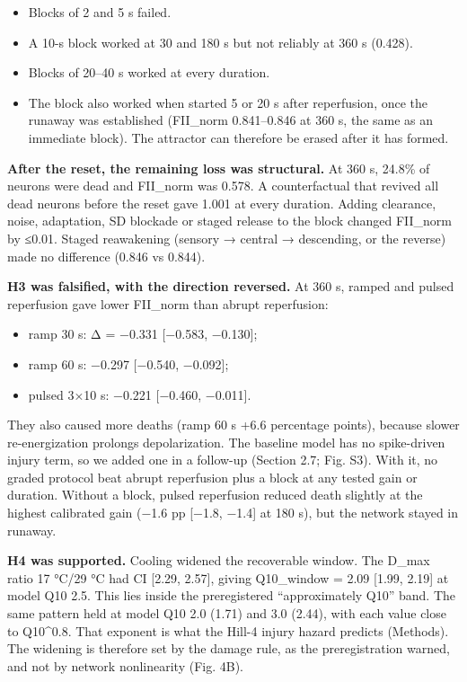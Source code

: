 \documentclass[11pt]{article}
\providecommand{\tightlist}{\setlength{\itemsep}{0pt}\setlength{\parskip}{0pt}}
\begin{document}
\begin{itemize}
\tightlist
\item
  Blocks of 2 and 5 s failed.
\item
  A 10-s block worked at 30 and 180 s but not reliably at 360 s (0.428).
\item
  Blocks of 20--40 s worked at every duration.
\item
  The block also worked when started 5 or 20 s after reperfusion, once the runaway was established (FII\_norm 0.841--0.846 at 360 s, the same as an immediate block). The attractor can therefore be erased after it has formed.
\end{itemize}

\textbf{After the reset, the remaining loss was structural.} At 360 s, 24.8\% of neurons were dead and FII\_norm was 0.578. A counterfactual that revived all dead neurons before the reset gave 1.001 at every duration. Adding clearance, noise, adaptation, SD blockade or staged release to the block changed FII\_norm by ≤0.01. Staged reawakening (sensory → central → descending, or the reverse) made no difference (0.846 vs 0.844).

\textbf{H3 was falsified, with the direction reversed.} At 360 s, ramped and pulsed reperfusion gave lower FII\_norm than abrupt reperfusion:

\begin{itemize}
\tightlist
\item
  ramp 30 s: Δ = −0.331 {[}−0.583, −0.130{]};
\item
  ramp 60 s: −0.297 {[}−0.540, −0.092{]};
\item
  pulsed 3×10 s: −0.221 {[}−0.460, −0.011{]}.
\end{itemize}

They also caused more deaths (ramp 60 s +6.6 percentage points), because slower re-energization prolongs depolarization. The baseline model has no spike-driven injury term, so we added one in a follow-up (Section 2.7; Fig. S3). With it, no graded protocol beat abrupt reperfusion plus a block at any tested gain or duration. Without a block, pulsed reperfusion reduced death slightly at the highest calibrated gain (−1.6 pp {[}−1.8, −1.4{]} at 180 s), but the network stayed in runaway.

\textbf{H4 was supported.} Cooling widened the recoverable window. The D\_max ratio 17 °C/29 °C had CI {[}2.29, 2.57{]}, giving Q10\_window = 2.09 {[}1.99, 2.19{]} at model Q10 2.5. This lies inside the preregistered ``approximately Q10'' band. The same pattern held at model Q10 2.0 (1.71) and 3.0 (2.44), with each value close to Q10\^{}0.8. That exponent is what the Hill-4 injury hazard predicts (Methods). The widening is therefore set by the damage rule, as the preregistration warned, and not by network nonlinearity (Fig. 4B).
\end{document}
